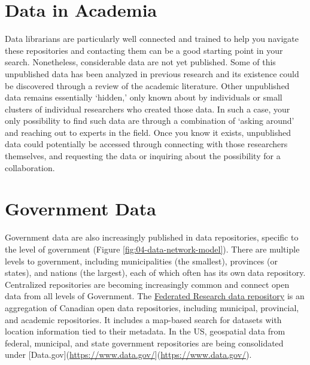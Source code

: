 \documentclass[
]{book}
\begin{document}
\hypertarget{data-in-academia}{%
\section{Data in Academia}\label{data-in-academia}}

Data librarians are particularly well connected and trained to help you navigate these repositories and contacting them can be a good starting point in your search. Nonetheless, considerable data are not yet published. Some of this unpublished data has been analyzed in previous research and its existence could be discovered through a review of the academic literature. Other unpublished data remains essentially `hidden,' only known about by individuals or small clusters of individual researchers who created those data. In such a case, your only possibility to find such data are through a combination of `asking around' and reaching out to experts in the field. Once you know it exists, unpublished data could potentially be accessed through connecting with those researchers themselves, and requesting the data or inquiring about the possibility for a collaboration.

\hypertarget{government-data}{%
\section{Government Data}\label{government-data}}

Government data are also increasingly published in data repositories, specific to the level of government (Figure \ref{fig:04-data-network-model}). There are multiple levels to government, including municipalities (the smallest), provinces (or states), and nations (the largest), each of which often has its own data repository. Centralized repositories are becoming increasingly common and connect open data from all levels of Government. The \href{https://www.frdr-dfdr.ca/repo/}{Federated Research data repository} is an aggregation of Canadian open data repositories, including municipal, provincial, and academic repositories. It includes a map-based search for datasets with location information tied to their metadata. In the US, geospatial data from federal, municipal, and state government repositories are being consolidated under {[}Data.gov{]}(\url{https://www.data.gov/}{]}(\url{https://www.data.gov/}).
\end{document}
